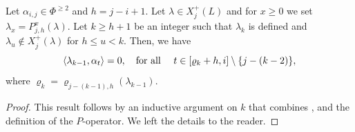    



\begin{lemma}\rm \label{lem: 0s de PPPPPPP}
    Let  $\alpha_{i,j}\in \Phi^{\geq 2}$ and $h=j-i+1$.
    Let $\lambda\in X_{j}^+(L)$ and for $x\geq 0$ we set  $\lambda_{x} = P^x_{j,h}(\lambda)$.
    Let $k\geq h+1$ be an integer such that  $\lambda_{k}$ is defined and $\lambda_{u}\notin X_{j}^+(\lambda) $  for $h\leq u<k$.
    Then, we have
    \begin{equation}\label{eq: 0s de PPPPPPP}
        \langle \lambda_{k-1} , \alpha_{t} \rangle =0,\quad\text{for all }\quad t\in [\varrho_{k}+h,i]\setminus \{j-(k-2)\},
    \end{equation}
   where $\varrho_{k} = \varrho_{j-(k-1),h}(\lambda_{k-1})$.
\end{lemma}



\begin{proof}
This result  follows by an inductive argument  on $k$ that  combines  ,   and the definition of the $P$-operator. 
We left the details to the reader.
\end{proof}


    
